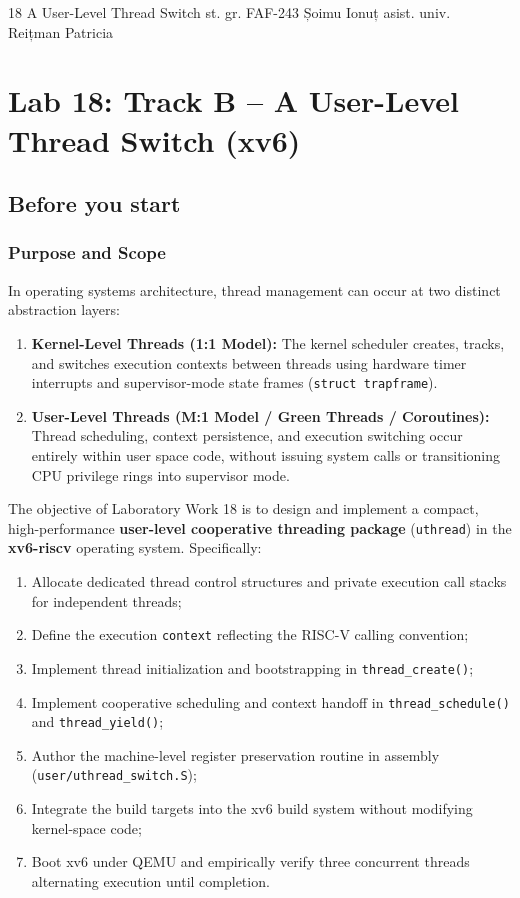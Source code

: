 \documentclass{labreport}
\begin{document}
\labtitle
    {18}
    {A User-Level Thread Switch}
    {st. gr. FAF-243}
    {Șoimu Ionuț}
    {asist. univ.\\[0.15cm] Reițman Patricia}

\tableofcontents
\newpage

\section{Lab 18: Track B -- A User-Level Thread Switch (xv6)}

\subsection{Before you start}

\subsubsection*{Purpose and Scope}
In operating systems architecture, thread management can occur at two distinct abstraction layers:
\begin{enumerate}[label=(\alph*), noitemsep]
    \item \textbf{Kernel-Level Threads (1:1 Model):} The kernel scheduler creates, tracks, and switches execution contexts between threads using hardware timer interrupts and supervisor-mode state frames (\texttt{struct trapframe}).
    \item \textbf{User-Level Threads (M:1 Model / Green Threads / Coroutines):} Thread scheduling, context persistence, and execution switching occur entirely within user space code, without issuing system calls or transitioning CPU privilege rings into supervisor mode.
\end{enumerate}

The objective of Laboratory Work 18 is to design and implement a compact, high-performance \textbf{user-level cooperative threading package} (\texttt{uthread}) in the \textbf{xv6-riscv} operating system. Specifically:
\begin{enumerate}[label=(\alph*), noitemsep]
    \item Allocate dedicated thread control structures and private execution call stacks for independent threads;
    \item Define the execution \texttt{context} reflecting the RISC-V calling convention;
    \item Implement thread initialization and bootstrapping in \texttt{thread\_create()};
    \item Implement cooperative scheduling and context handoff in \texttt{thread\_schedule()} and \texttt{thread\_yield()};
    \item Author the machine-level register preservation routine in assembly (\texttt{user/uthread\_switch.S});
    \item Integrate the build targets into the xv6 build system without modifying kernel-space code;
    \item Boot xv6 under QEMU and empirically verify three concurrent threads alternating execution until completion.
\end{enumerate}
\end{document}

